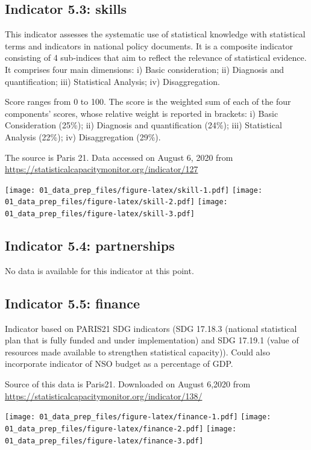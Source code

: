 \documentclass[]{article}
\begin{document}
\hypertarget{indicator-5.3-skills}{%
\subsection{Indicator 5.3: skills}\label{indicator-5.3-skills}}

This indicator assesses the systematic use of statistical knowledge with
statistical terms and indicators in national policy documents. It is a
composite indicator consisting of 4 sub-indices that aim to reflect the
relevance of statistical evidence. It comprises four main dimensions: i)
Basic consideration; ii) Diagnosis and quantification; iii) Statistical
Analysis; iv) Disaggregation.

Score ranges from 0 to 100. The score is the weighted sum of each of the
four components' scores, whose relative weight is reported in brackets:
i) Basic Consideration (25\%); ii) Diagnosis and quantification (24\%);
iii) Statistical Analysis (22\%); iv) Disaggregation (29\%).

The source is Paris 21. Data accessed on August 6, 2020 from
\url{https://statisticalcapacitymonitor.org/indicator/127}

\texttt{[image: 01\_data\_prep\_files/figure-latex/skill-1.pdf]}
\texttt{[image: 01\_data\_prep\_files/figure-latex/skill-2.pdf]}
\texttt{[image: 01\_data\_prep\_files/figure-latex/skill-3.pdf]}

\hypertarget{indicator-5.4-partnerships}{%
\subsection{Indicator 5.4:
partnerships}\label{indicator-5.4-partnerships}}

No data is available for this indicator at this point.

\hypertarget{indicator-5.5-finance}{%
\subsection{Indicator 5.5: finance}\label{indicator-5.5-finance}}

Indicator based on PARIS21 SDG indicators (SDG 17.18.3 (national
statistical plan that is fully funded and under implementation) and SDG
17.19.1 (value of resources made available to strengthen statistical
capacity)). Could also incorporate indicator of NSO budget as a
percentage of GDP.

Source of this data is Paris21. Downloaded on August 6,2020 from
\url{https://statisticalcapacitymonitor.org/indicator/138/}

\texttt{[image: 01\_data\_prep\_files/figure-latex/finance-1.pdf]}
\texttt{[image: 01\_data\_prep\_files/figure-latex/finance-2.pdf]}
\texttt{[image: 01\_data\_prep\_files/figure-latex/finance-3.pdf]}
\end{document}
